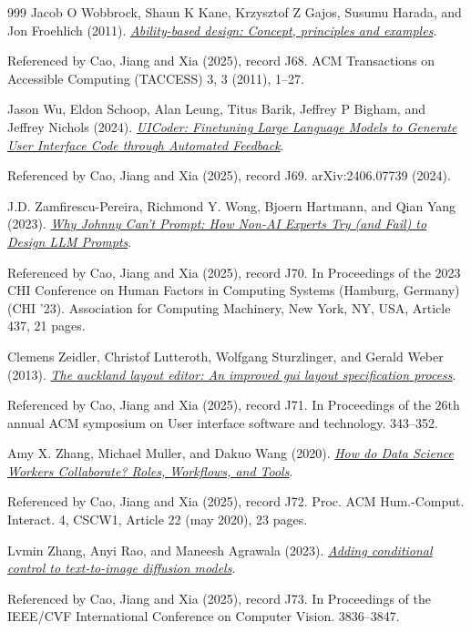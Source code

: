 \documentclass[11pt,letterpaper]{article}
\begin{document}
\begin{thebibliography}{999}
Jacob O Wobbrock, Shaun K Kane, Krzysztof Z Gajos, Susumu Harada, and Jon Froehlich (2011).
\href{https://faculty.washington.edu/wobbrock/pubs/taccess-11.pdf}{\emph{Ability-based design: Concept, principles and examples}}.
\par {\small Referenced by Cao, Jiang and Xia (2025), record J68. ACM Transactions on Accessible Computing (TACCESS) 3, 3 (2011), 1–27.}

Jason Wu, Eldon Schoop, Alan Leung, Titus Barik, Jeffrey P Bigham, and Jeffrey Nichols (2024).
\href{https://arxiv.org/abs/2406.07739}{\emph{UICoder: Finetuning Large Language Models to Generate User Interface Code through Automated Feedback}}.
\par {\small Referenced by Cao, Jiang and Xia (2025), record J69. arXiv:2406.07739 (2024).}

J.D. Zamfirescu-Pereira, Richmond Y. Wong, Bjoern Hartmann, and Qian Yang (2023).
\href{https://doi.org/10.1145/3544548.3581388}{\emph{Why Johnny Can’t Prompt: How Non-AI Experts Try (and Fail) to Design LLM Prompts}}.
\par {\small Referenced by Cao, Jiang and Xia (2025), record J70. In Proceedings of the 2023 CHI Conference on Human Factors in Computing Systems (Hamburg, Germany) (CHI ’23). Association for Computing Machinery, New York, NY, USA, Article 437, 21 pages.}

Clemens Zeidler, Christof Lutteroth, Wolfgang Sturzlinger, and Gerald Weber (2013).
\href{https://arxiv.org/html/2503.04084v1\#bib.bib72}{\emph{The auckland layout editor: An improved gui layout specification process}}.
\par {\small Referenced by Cao, Jiang and Xia (2025), record J71. In Proceedings of the 26th annual ACM symposium on User interface software and technology. 343–352.}

Amy X. Zhang, Michael Muller, and Dakuo Wang (2020).
\href{https://doi.org/10.1145/3392826}{\emph{How do Data Science Workers Collaborate? Roles, Workflows, and Tools}}.
\par {\small Referenced by Cao, Jiang and Xia (2025), record J72. Proc. ACM Hum.-Comput. Interact. 4, CSCW1, Article 22 (may 2020), 23 pages.}

Lvmin Zhang, Anyi Rao, and Maneesh Agrawala (2023).
\href{https://arxiv.org/abs/2302.05543}{\emph{Adding conditional control to text-to-image diffusion models}}.
\par {\small Referenced by Cao, Jiang and Xia (2025), record J73. In Proceedings of the IEEE/CVF International Conference on Computer Vision. 3836–3847.}


\end{thebibliography}
\end{document}
